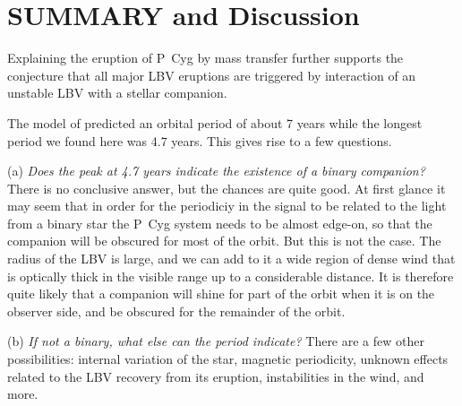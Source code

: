 \documentclass[twocolumn]{aastex62}
\begin{document}
\section{SUMMARY and Discussion}
\label{sec:summary}

Explaining the eruption of P~Cyg by mass transfer further supports
the conjecture that all major LBV eruptions are triggered by interaction
of an unstable LBV with a stellar companion.

The model of \cite{Kashi2010} predicted an orbital period of about 7 years while the longest period we found here was 4.7 years.
This gives rise to a few questions.

(a) \textit{Does the peak at 4.7 years indicate the existence of a binary companion?} There is no conclusive answer, but the chances are quite good. At first glance it may seem that in order for the periodiciy in the signal to be related to the light from a binary star the P~Cyg system needs to be almost edge-on, so that the companion will be obscured for most of the orbit. But this is not the case. The radius of the LBV is large, and we can add to it a wide region of dense wind that is optically thick in the visible range up to a considerable distance. It is therefore quite likely that a companion will shine for part of the orbit when it is on the observer side, and be obscured for the remainder of the orbit. 

(b) \textit{If not a binary, what else can the period indicate?} There are a few other possibilities: internal variation of the star, magnetic periodicity, unknown effects related to the LBV recovery from its eruption,
instabilities in the wind, and more.
\end{document}
